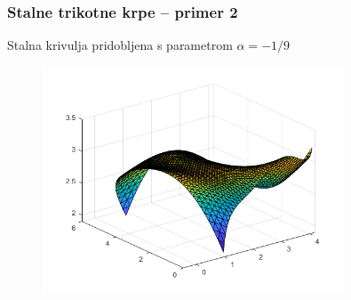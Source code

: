 \documentclass{beamer}
\begin{document}
\begin{frame}
    \frametitle{Stalne trikotne krpe -- primer 2}
    Stalna krivulja pridobljena s parametrom $\alpha = -1/9$ 
    \begin{figure}
        \includegraphics[width=0.8\textwidth]{trikotne_1_9.png}
    \end{figure}
\end{frame}
\end{document}
